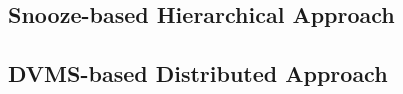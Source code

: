\subsection{Snooze-based Hierarchical Approach}
\label{subsec:snooze}


\subsection{DVMS-based Distributed Approach}
\label{subsec:dvms}




